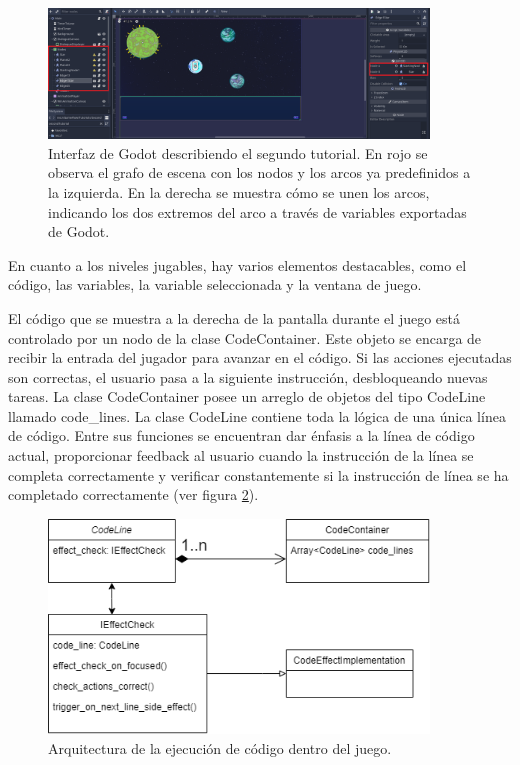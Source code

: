 \begin{figure}[h]
	\centering
	\includegraphics[width=0.9\textwidth]{imagenes/SecondTutorialGraph.png}
	\caption{Interfaz de Godot describiendo el segundo tutorial. En rojo se observa el grafo de escena con los nodos y los arcos ya predefinidos a la izquierda. En la derecha se muestra cómo se unen los arcos, indicando los dos extremos del arco a través de variables exportadas de Godot.}
	\label{SecondTutorialGraph}
\end{figure}


En cuanto a los niveles jugables, hay varios elementos destacables, como el código, las variables, la variable seleccionada y la ventana de juego.

El código que se muestra a la derecha de la pantalla durante el juego está controlado por un nodo de la clase CodeContainer. Este objeto se encarga de recibir la entrada del jugador para avanzar en el código. Si las acciones ejecutadas son correctas, el usuario pasa a la siguiente instrucción, desbloqueando nuevas tareas. La clase CodeContainer posee un arreglo de objetos del tipo CodeLine llamado code_lines. La clase CodeLine contiene toda la lógica de una única línea de código. Entre sus funciones se encuentran dar énfasis a la línea de código actual, proporcionar feedback al usuario cuando la instrucción de la línea se completa correctamente y verificar constantemente si la instrucción de línea se ha completado correctamente (ver figura \ref{CodeLinesArchitecture}).

\begin{figure}[h]
	\centering
	\includegraphics[width=0.9\textwidth]{imagenes/CodeLinesArchitecture.png}
	\caption{Arquitectura de la ejecución de código dentro del juego.}
	\label{CodeLinesArchitecture}
\end{figure}

